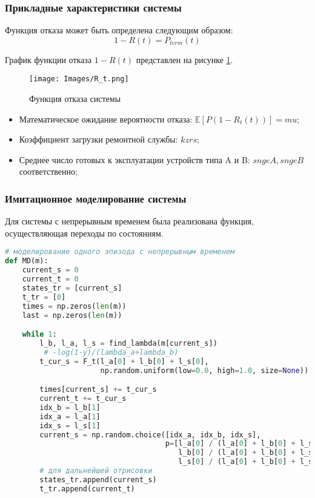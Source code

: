 {{\subsubsection{Прикладные характеристики системы}

Функция отказа может быть определена следующим образом:
$$1-R(t) = P_{term}(t)$$

График функции отказа $1-R(t)$ представлен на рисунке \ref{R_t}.
\begin{figure}[H]
\centerline{\texttt{[image: Images/R\_t.png]}}
\caption{Функция отказа системы}
\label{R_t}
\end{figure}

\begin{itemize}
    \item Математическое ожидание вероятности отказа:
$\mathbb{E}[P(1-R_t(t))]={{ mu }} $;
\item Коэффициент загрузки ремонтной службы: ${{ kzrs }}$;
\item Среднее число готовых к эксплуатации устройств типа  A и B: ${{ sngeA }}, {{ sngeB }}$ соответственно;
\end{itemize}

\subsubsection{Имитационное моделирование системы}

Для системы с непрерывным временем была реализована функция, осуществляющая переходы по состояниям.

\begin{lstlisting}[language=python, label=prog,caption={\textit{реализация марковского процесса}}]
# моделирование одного эпизода с непрерывным временем
def MD(m):
    current_s = 0
    current_t = 0
    states_tr = [current_s]
    t_tr = [0]
    times = np.zeros(len(m))
    last = np.zeros(len(m))

    while 1:
        l_b, l_a, l_s = find_lambda(m[current_s])
         # -log(1-y)/(lambda_a+lambda_b)
        t_cur_s = F_t(l_a[0] + l_b[0] + l_s[0],
                      np.random.uniform(low=0.0, high=1.0, size=None))

        times[current_s] += t_cur_s
        current_t += t_cur_s
        idx_b = l_b[1]
        idx_a = l_a[1]
        idx_s = l_s[1]
        current_s = np.random.choice([idx_a, idx_b, idx_s],
                                     p=[l_a[0] / (l_a[0] + l_b[0] + l_s[0]),
                                        l_b[0] / (l_a[0] + l_b[0] + l_s[0]),
                                        l_s[0] / (l_a[0] + l_b[0] + l_s[0])])
        # для дальнейшей отрисовки
        states_tr.append(current_s)
        t_tr.append(current_t)


\end{lstlisting}}}
